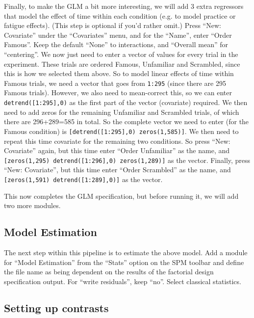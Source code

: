 Finally, to make the GLM a bit more interesting, we will add 3 extra regressors that model the effect of time within each condition (e.g. to model practice or fatigue effects). (This step is optional if you'd rather omit.) Press ``New: Covariate'' under the ``Covariates'' menu, and for the ``Name'', enter ``Order Famous''. Keep the default ``None'' to interactions, and ``Overall mean'' for ``centering''. We now just need to enter a vector of values for every trial in the experiment. These trials are ordered Famous, Unfamiliar and Scrambled, since this is how we selected them above. So to model linear effects of time within Famous trials, we need a vector that goes from \texttt{1:295} (since there are 295 Famous trials). However, we also need to mean-correct this, so we can enter \texttt{detrend([1:295],0)} as the first part of the vector (covariate) required. We then need to add zeros for the remaining Unfamiliar and Scrambled trials, of which there are 296+289=585 in total. So the complete vector we need to enter (for the Famous condition) is \texttt{[detrend([1:295],0) zeros(1,585)]}. We then need to repeat this time covariate for the remaining two conditions. So press ``New: Covariate'' again, but this time enter ``Order Unfamiliar'' as the name, and \texttt{[zeros(1,295) detrend([1:296],0) zeros(1,289)]} as the vector. Finally, press ``New: Covariate'', but this time enter ``Order Scrambled'' as the name, and \texttt{[zeros(1,591) detrend([1:289],0)]} as the vector.

This now completes the GLM specification, but before running it, we will add two more modules.

\subsection{Model Estimation}

The next step within this pipeline is to estimate the above model. Add a module for ``Model Estimation'' from the ``Stats'' option on the SPM toolbar and define the file name as being dependent on the results of the factorial design specification output. For ``write residuals'', keep ``no''. Select classical statistics.

\subsection{Setting up contrasts}

